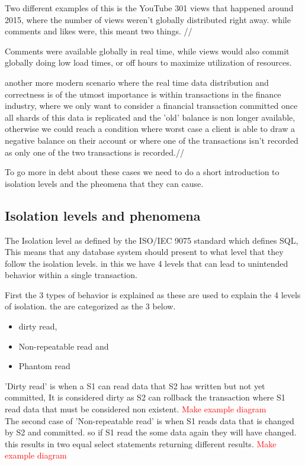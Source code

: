 \documentclass[
  a4paper,  %
  twoside,  %
  bibliography=totoc,
  headsepline,
  cleardoublepage=empty,
  parskip=half,
  draft=false
]{scrbook}
\begin{document}
Two different examples of this is the YouTube 301 views that happened around 2015, where the number of views weren't globally distributed right away. while comments and likes were, this meant two things. //

Comments were available globally in real time, while views would also commit globally doing low load times, or off hours to maximize utilization of resources.

another more modern scenario where the real time data distribution and correctness is of the utmost importance is within transactions in the finance industry,  where we only want to consider a financial transaction committed once all shards of this data is replicated and the 'old' balance is non longer available, otherwise we could reach a condition where worst case a client is able to draw a negative balance on their account or where one of the transactions isn't recorded as only one of the two transactions is recorded.//

To go more in debt about these cases we need to do a short introduction to isolation levels and the pheomena that they can cause.


\subsection{Isolation levels and phenomena}

The Isolation level as defined by the ISO/IEC 9075 standard which defines SQL, This means that any database system should present to what level that they follow the isolation levels. in this we have 4 levels that can lead to unintended behavior within a single transaction. 

First the 3 types of behavior is explained as these are used to explain the 4 levels of isolation. the are categorized as the 3 below.
\begin{itemize}
\item dirty read,
\item Non-repeatable read and
\item Phantom read
\end{itemize}

'Dirty read' is when a S1 can read data that S2 has written but not yet committed, It is considered dirty as S2 can rollback the transaction where S1 read data that must be considered non existent. \textcolor{red}{Make example diagram} 
\\
The second case of 'Non-repeatable read' is when S1 reads data that is changed by S2 and committed. so if S1 read the some data again they will have changed. this results in two equal select statements returning different results.  \textcolor{red}{Make example diagram} 
\end{document}
